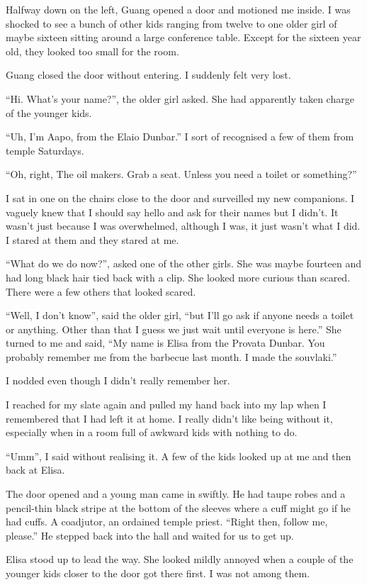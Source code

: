 Halfway down on the left, Guang opened a door and motioned me inside. I was shocked to see a bunch of other kids ranging from twelve to one older girl of maybe sixteen sitting around a large conference table. Except for the sixteen year old, they looked too small for the room.

Guang closed the door without entering. I suddenly felt very lost.

``Hi. What's your name?'', the older girl asked. She had apparently taken charge of the younger kids.

``Uh, I'm Aapo, from the Elaio Dunbar.'' I sort of recognised a few of them from temple Saturdays.

``Oh, right, The oil makers. Grab a seat. Unless you need a toilet or something?''

I sat in one on the chairs close to the door and surveilled my new companions. I vaguely knew that I should say hello and ask for their names but I didn't. It wasn't just because I was overwhelmed, although I was, it just wasn't what I did. I stared at them and they stared at me.

``What do we do now?'', asked one of the other girls. She was maybe fourteen and had long black hair tied back with a clip. She looked more curious than scared. There were a few others that looked scared.

``Well, I don't know'', said the older girl, ``but I'll go ask if anyone needs a toilet or anything. Other than that I guess we just wait until everyone is here.'' She turned to me and said, ``My name is Elisa from the Provata Dunbar. You probably remember me from the barbecue last month. I made the souvlaki.''

I nodded even though I didn't really remember her.

I reached for my slate again and pulled my hand back into my lap when I remembered that I had left it at home. I really didn't like being without it, especially when in a room full of awkward kids with nothing to do.

``Umm'', I said without realising it. A few of the kids looked up at me and then back at Elisa.

The door opened and a young man came in swiftly. He had taupe robes and a pencil-thin black stripe at the bottom of the sleeves where a cuff might go if he had cuffs. A coadjutor, an ordained temple priest. ``Right then, follow me, please.'' He stepped back into the hall and waited for us to get up. 

Elisa stood up to lead the way. She looked mildly annoyed when a couple of the younger kids closer to the door got there first. I was not among them.

